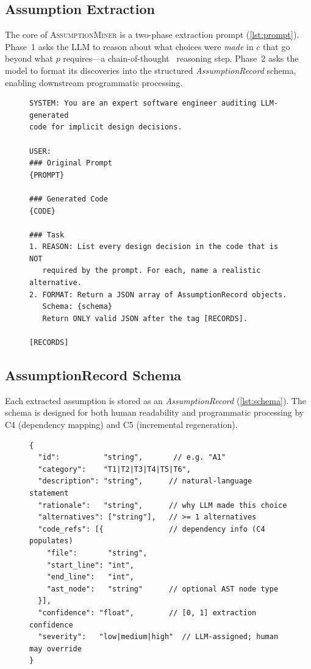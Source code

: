 \documentclass[sigconf,review,anonymous]{acmart}
\newcommand{\sysname}{\textsc{AssumptionMiner}\xspace}
\begin{document}
\subsection{Assumption Extraction}
\label{sec:extractor}

The core of \sysname is a two-phase extraction prompt (\cref{lst:prompt}).
Phase~1 asks the LLM to reason about what choices were \emph{made} in $c$ that go
beyond what $p$ requires—a chain-of-thought~\cite{wei2022cot} reasoning step.
Phase~2 asks the model to format its discoveries into the structured
\emph{AssumptionRecord} schema, enabling downstream programmatic processing.

\begin{figure}[t]
\begin{lstlisting}[caption={Assumption extraction prompt template (abbreviated).
  \texttt{\{PROMPT\}} and \texttt{\{CODE\}} are replaced at runtime.},
  label={lst:prompt}, language={}]
SYSTEM: You are an expert software engineer auditing LLM-generated
code for implicit design decisions.

USER:
### Original Prompt
{PROMPT}

### Generated Code
{CODE}

### Task
1. REASON: List every design decision in the code that is NOT
   required by the prompt. For each, name a realistic alternative.
2. FORMAT: Return a JSON array of AssumptionRecord objects.
   Schema: {schema}
   Return ONLY valid JSON after the tag [RECORDS].

[RECORDS]
\end{lstlisting}
\end{figure}

\subsection{AssumptionRecord Schema}
\label{sec:schema}

Each extracted assumption is stored as an \emph{AssumptionRecord}
(\cref{lst:schema}).  The schema is designed for both human readability and
programmatic processing by C4 (dependency mapping) and C5 (incremental regeneration).

\begin{figure}[t]
\begin{lstlisting}[caption={AssumptionRecord JSON schema.},
  label={lst:schema}, language={}]
{
  "id":          "string",       // e.g. "A1"
  "category":    "T1|T2|T3|T4|T5|T6",
  "description": "string",      // natural-language statement
  "rationale":   "string",      // why LLM made this choice
  "alternatives": ["string"],   // >= 1 alternatives
  "code_refs": [{               // dependency info (C4 populates)
    "file":       "string",
    "start_line": "int",
    "end_line":   "int",
    "ast_node":   "string"      // optional AST node type
  }],
  "confidence": "float",        // [0, 1] extraction confidence
  "severity":   "low|medium|high"  // LLM-assigned; human may override
}
\end{lstlisting}
\end{figure}
\end{document}
